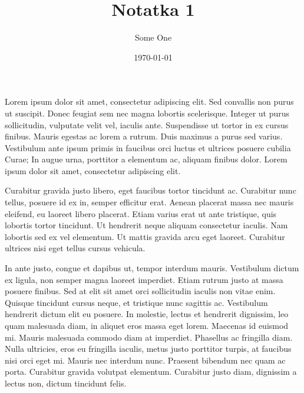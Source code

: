 \documentclass{article}
\title{Notatka 1}
\author{Some One}
\date{\today}
\begin{document}
    \maketitle
    Lorem ipsum dolor sit amet, consectetur adipiscing elit. Sed convallis non purus ut suscipit. 
    Donec feugiat sem nec magna lobortis scelerisque. Integer ut purus sollicitudin, vulputate velit vel, 
    iaculis ante. Suspendisse ut tortor in ex cursus finibus. Mauris egestas ac lorem a rutrum. 
    Duis maximus a purus sed varius. Vestibulum ante ipsum primis in faucibus orci luctus et ultrices 
    posuere cubilia Curae; In augue urna, porttitor a elementum ac, aliquam finibus dolor. 
    Lorem ipsum dolor sit amet, consectetur adipiscing elit.

    Curabitur gravida justo libero, eget faucibus tortor tincidunt ac. Curabitur nunc tellus, 
    posuere id ex in, semper efficitur erat. Aenean placerat massa nec mauris eleifend, eu laoreet 
    libero placerat. Etiam varius erat ut ante tristique, quis lobortis tortor tincidunt. 
    Ut hendrerit neque aliquam consectetur iaculis. Nam lobortis sed ex vel elementum. Ut mattis gravida 
    arcu eget laoreet. Curabitur ultrices nisi eget tellus cursus vehicula.

    In ante justo, congue et dapibus ut, tempor interdum mauris. Vestibulum dictum ex ligula, 
    non semper magna laoreet imperdiet. Etiam rutrum justo at massa posuere finibus. Sed at elit 
    sit amet orci sollicitudin iaculis non vitae enim. Quisque tincidunt cursus neque, et tristique 
    nunc sagittis ac. Vestibulum hendrerit dictum elit eu posuere. In molestie, lectus et hendrerit dignissim, 
    leo quam malesuada diam, in aliquet eros massa eget lorem. Maecenas id euismod mi. Mauris malesuada commodo 
    diam at imperdiet. Phasellus ac fringilla diam. Nulla ultricies, eros eu fringilla iaculis, 
    metus justo porttitor turpis, at faucibus nisi orci eget mi. Mauris nec interdum nunc. 
    Praesent bibendum nec quam ac porta. Curabitur gravida volutpat elementum. Curabitur justo diam, 
    dignissim a lectus non, dictum tincidunt felis.

    
    \newpage


\end{document}
